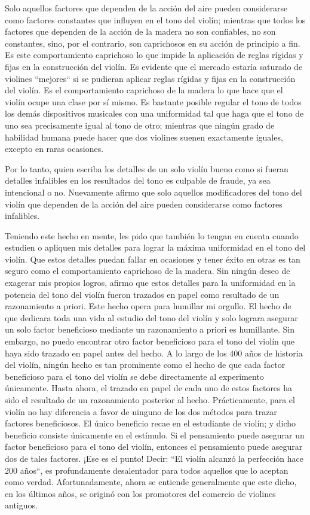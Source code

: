 \documentclass[12pt]{book}
\begin{document}
Solo aquellos factores que dependen de la acción del aire pueden considerarse como factores constantes que influyen en el tono del violín; mientras que todos los factores que dependen de la acción de la madera no son confiables, no son constantes, sino, por el contrario, son caprichosos en su acción de principio a fin. Es este comportamiento caprichoso lo que impide la aplicación de reglas rígidas y fijas en la construcción del violín. Es evidente que el mercado estaría saturado de violines ``mejores`` si se pudieran aplicar reglas rígidas y fijas en la construcción del violín. Es el comportamiento caprichoso de la madera lo que hace que el violín ocupe una clase por sí mismo. Es bastante posible regular el tono de todos los demás dispositivos musicales con una uniformidad tal que haga que el tono de uno sea precisamente igual al tono de otro; mientras que ningún grado de habilidad humana puede hacer que dos violines suenen exactamente iguales, excepto en raras ocasiones.

Por lo tanto, quien escriba los detalles de un solo violín bueno como si fueran detalles infalibles en los resultados del tono es culpable de fraude, ya sea intencional o no. Nuevamente afirmo que solo aquellos modificadores del tono del violín que dependen de la acción del aire pueden considerarse como factores infalibles.

Teniendo este hecho en mente, les pido que también lo tengan en cuenta cuando estudien o apliquen mis detalles para lograr la máxima uniformidad en el tono del violín. Que estos detalles puedan fallar en ocasiones y tener éxito en otras es tan seguro como el comportamiento caprichoso de la madera. Sin ningún deseo de exagerar mis propios logros, afirmo que estos detalles para la uniformidad en la potencia del tono del violín fueron trazados en papel como resultado de un razonamiento a priori. Este hecho opera para humillar mi orgullo. El hecho de que dedicara toda una vida al estudio del tono del violín y solo lograra asegurar un solo factor beneficioso mediante un razonamiento a priori es humillante. Sin embargo, no puedo encontrar otro factor beneficioso para el tono del violín que haya sido trazado en papel antes del hecho. A lo largo de los 400 años de historia del violín, ningún hecho es tan prominente como el hecho de que cada factor beneficioso para el tono del violín se debe directamente al experimento únicamente. Hasta ahora, el trazado en papel de cada uno de estos factores ha sido el resultado de un razonamiento posterior al hecho. Prácticamente, para el violín no hay diferencia a favor de ninguno de los dos métodos para trazar factores beneficiosos. El único beneficio recae en el estudiante de violín; y dicho beneficio consiste únicamente en el estímulo. Si el pensamiento puede asegurar un factor beneficioso para el tono del violín, entonces el pensamiento puede asegurar dos de tales factores. ¡Ese es el punto! Decir: ``El violín alcanzó la perfección hace 200 años``, es profundamente desalentador para todos aquellos que lo aceptan como verdad. Afortunadamente, ahora se entiende generalmente que este dicho, en los últimos años, se originó con los promotores del comercio de violines antiguos.
\end{document}
